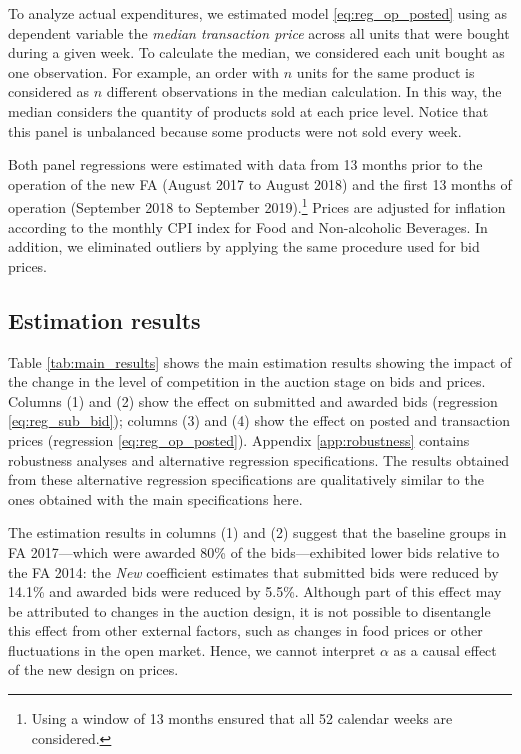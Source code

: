 To analyze actual expenditures, we estimated model \eqref{eq:reg_op_posted} using as dependent variable the \emph{median transaction price} across all units that were bought during a given week. To calculate the median, we considered each unit bought as one observation. For example, an order with $n$ units for the same product is considered as $n$ different observations in the median calculation. In this way, the median considers the quantity of products sold at each price level. Notice that this panel is unbalanced because some products were not sold  every week.

Both panel regressions were estimated with data from 13 months prior to the operation of the new FA (August 2017 to August 2018) and the first 13 months of operation (September 2018 to September 2019).\footnote{Using a window of 13 months ensured that all 52 calendar weeks are considered.} Prices are adjusted for inflation according to the monthly CPI index for Food and Non-alcoholic Beverages. In addition, we eliminated outliers by applying the same procedure used for bid prices.

\subsection{Estimation results}

Table \ref{tab:main_results} shows the main estimation results showing the impact of the change in the level of competition  in the  auction stage on bids and prices. Columns (1) and (2) show the effect on submitted and awarded bids (regression \ref{eq:reg_sub_bid}); columns (3) and (4) show the effect on posted and transaction prices (regression \ref{eq:reg_op_posted}). Appendix \ref{app:robustness} contains robustness analyses and alternative regression specifications. The results obtained from these alternative regression specifications are qualitatively similar to the ones obtained with the main  specifications here.



 The estimation results in columns (1) and (2) suggest that the baseline groups in FA 2017---which were awarded 80\% of the bids---exhibited lower bids relative to the FA 2014: the \textit{New} coefficient estimates that submitted bids were reduced by 14.1\% and awarded bids were reduced by 5.5\%. Although part of this effect may be attributed to changes in the auction design,  it is not possible to disentangle this effect from other external factors, such as changes in food prices or other fluctuations in the open market. Hence, we cannot interpret $\alpha$ as a causal effect of the new design on prices.%
 

